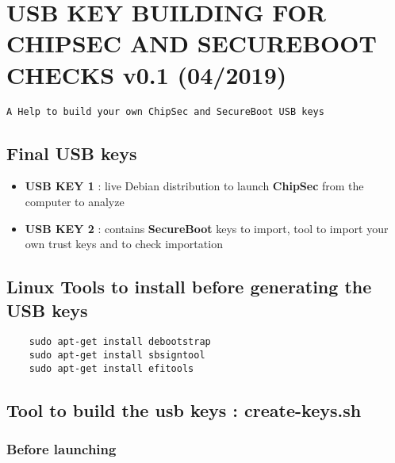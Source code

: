 \hypertarget{usb-key-building-for-chipsec-and-secureboot-checks-v0.1-042019}{%
\section{USB KEY BUILDING FOR CHIPSEC AND SECUREBOOT CHECKS v0.1
(04/2019)}\label{usb-key-building-for-chipsec-and-secureboot-checks-v0.1-042019}}

\begin{verbatim}
A Help to build your own ChipSec and SecureBoot USB keys
\end{verbatim}

\hypertarget{final-usb-keys}{%
\subsection{Final USB keys}\label{final-usb-keys}}

\begin{itemize}
\tightlist
\item
  \textbf{USB KEY 1} : live Debian distribution to launch
  \textbf{ChipSec} from the computer to analyze
\item
  \textbf{USB KEY 2} : contains \textbf{SecureBoot} keys to import, tool
  to import your own trust keys and to check importation
\end{itemize}

\hypertarget{linux-tools-to-install-before-generating-the-usb-keys}{%
\subsection{Linux Tools to install before generating the USB
keys}\label{linux-tools-to-install-before-generating-the-usb-keys}}

\begin{verbatim}
    sudo apt-get install debootstrap
    sudo apt-get install sbsigntool
    sudo apt-get install efitools
\end{verbatim}

\hypertarget{tool-to-build-the-usb-keys-create-keys.sh}{%
\subsection{Tool to build the usb keys :
create-keys.sh}\label{tool-to-build-the-usb-keys-create-keys.sh}}

\hypertarget{before-launching}{%
\subsubsection{Before launching}\label{before-launching}}

